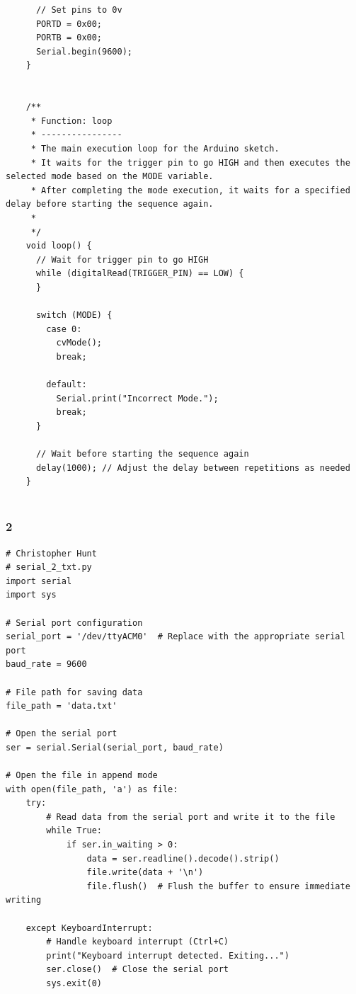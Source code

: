 \documentclass{article}
\begin{document}
\begin{lstlisting}
      // Set pins to 0v
      PORTD = 0x00;
      PORTB = 0x00;
      Serial.begin(9600);
    }
    
    
    /**
     * Function: loop
     * ----------------
     * The main execution loop for the Arduino sketch.
     * It waits for the trigger pin to go HIGH and then executes the selected mode based on the MODE variable.
     * After completing the mode execution, it waits for a specified delay before starting the sequence again.
     *
     */
    void loop() {
      // Wait for trigger pin to go HIGH
      while (digitalRead(TRIGGER_PIN) == LOW) {
      }
    
      switch (MODE) {
        case 0:
          cvMode();
          break;
    
        default:
          Serial.print("Incorrect Mode.");
          break;
      }
    
      // Wait before starting the sequence again
      delay(1000); // Adjust the delay between repetitions as needed
    }
    
\end{lstlisting}

\newpage\subsubsection*{2}
\begin{lstlisting}
# Christopher Hunt
# serial_2_txt.py
import serial
import sys

# Serial port configuration
serial_port = '/dev/ttyACM0'  # Replace with the appropriate serial port
baud_rate = 9600

# File path for saving data
file_path = 'data.txt'

# Open the serial port
ser = serial.Serial(serial_port, baud_rate)

# Open the file in append mode
with open(file_path, 'a') as file:
    try:
        # Read data from the serial port and write it to the file
        while True:
            if ser.in_waiting > 0:
                data = ser.readline().decode().strip()
                file.write(data + '\n')
                file.flush()  # Flush the buffer to ensure immediate writing

    except KeyboardInterrupt:
        # Handle keyboard interrupt (Ctrl+C)
        print("Keyboard interrupt detected. Exiting...")
        ser.close()  # Close the serial port
        sys.exit(0)

\end{lstlisting}
\end{document}
